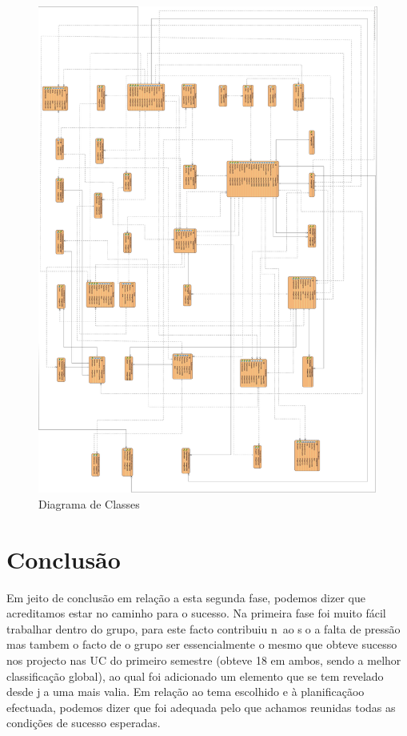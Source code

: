 ﻿\documentclass[12pt,a4paper]{article}
\begin{document}
\begin{figure}[h!]
\centering
\includegraphics[scale=0.15]{basedados}
\caption{Diagrama de Classes} 
\end{figure} 

\clearpage
\section{Conclusão} 
Em jeito de conclusão em relação a esta segunda fase, podemos dizer que acreditamos estar no caminho para o sucesso.
Na primeira fase foi muito fácil trabalhar dentro do grupo, para este facto contribuiu n~ao so a falta
de pressão mas tambem o facto de o grupo ser essencialmente o mesmo que obteve sucesso
nos projecto nas UC do primeiro semestre (obteve 18 em ambos, sendo a melhor classificação global),
ao qual foi adicionado um elemento que se tem revelado desde ja uma mais valia.
Em relação ao tema escolhido e à planificaçãoo efectuada, podemos dizer que foi adequada
pelo que achamos reunidas todas as condições de sucesso esperadas.
\end{document}
